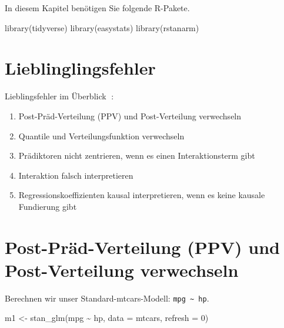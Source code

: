 \documentclass[
  a4paper,
  DIV=11]{scrreprt}
\newenvironment{Shaded}{\begin{snugshade}}{\end{snugshade}}
\newcommand{\AttributeTok}[1]{\textcolor[rgb]{0.40,0.45,0.13}{#1}}
\newcommand{\DecValTok}[1]{\textcolor[rgb]{0.68,0.00,0.00}{#1}}
\newcommand{\FunctionTok}[1]{\textcolor[rgb]{0.28,0.35,0.67}{#1}}
\newcommand{\NormalTok}[1]{\textcolor[rgb]{0.00,0.23,0.31}{#1}}
\newcommand{\OtherTok}[1]{\textcolor[rgb]{0.00,0.23,0.31}{#1}}
\newcommand{\SpecialCharTok}[1]{\textcolor[rgb]{0.37,0.37,0.37}{#1}}
\providecommand{\tightlist}{%
  \setlength{\itemsep}{0pt}\setlength{\parskip}{0pt}}\usepackage{longtable,booktabs,array}
\theoremstyle{definition}
\theoremstyle{remark}
\begin{document}
In diesem Kapitel benötigen Sie folgende R-Pakete.

\begin{Shaded}
\begin{Highlighting}[]
\FunctionTok{library}\NormalTok{(tidyverse)}
\FunctionTok{library}\NormalTok{(easystats)}
\FunctionTok{library}\NormalTok{(rstanarm)}
\end{Highlighting}
\end{Shaded}

\hypertarget{lieblinglingsfehler}{%
\section{Lieblinglingsfehler}\label{lieblinglingsfehler}}

Lieblingsfehler im Überblick 🤷:

\begin{enumerate}
\def\labelenumi{\arabic{enumi}.}
\tightlist
\item
  Post-Präd-Verteilung (PPV) und Post-Verteilung verwechseln
\item
  Quantile und Verteilungsfunktion verwechseln
\item
  Prädiktoren nicht zentrieren, wenn es einen Interaktionsterm gibt
\item
  Interaktion falsch interpretieren
\item
  Regressionskoeffizienten kausal interpretieren, wenn es keine kausale
  Fundierung gibt
\end{enumerate}

\hypertarget{post-pruxe4d-verteilung-ppv-und-post-verteilung-verwechseln}{%
\section{Post-Präd-Verteilung (PPV) und Post-Verteilung verwechseln
🤷}\label{post-pruxe4d-verteilung-ppv-und-post-verteilung-verwechseln}}

Berechnen wir unser Standard-mtcars-Modell:
\texttt{mpg\ \textasciitilde{}\ hp}.

\begin{Shaded}
\begin{Highlighting}[]
\NormalTok{m1 }\OtherTok{\textless{}{-}} \FunctionTok{stan\_glm}\NormalTok{(mpg }\SpecialCharTok{\textasciitilde{}}\NormalTok{ hp, }\AttributeTok{data =}\NormalTok{ mtcars, }\AttributeTok{refresh =} \DecValTok{0}\NormalTok{)}
\end{Highlighting}
\end{Shaded}
\end{document}
